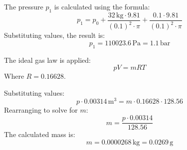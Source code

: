 The pressure \( p_1 \) is calculated using the formula:  
\[
p_1 = p_0 + \frac{32 \, \text{kg} \cdot 9.81}{(0.1)^2 \cdot \pi} + \frac{0.1 \cdot 9.81}{(0.1)^2 \cdot \pi}
\]  
Substituting values, the result is:  
\[
p_1 = 110023.6 \, \text{Pa} = 1.1 \, \text{bar}
\]  

The ideal gas law is applied:  
\[
pV = mRT
\]  
Where \( R = 0.16628 \).  

Substituting values:  
\[
p \cdot 0.00314 \, \text{m}^3 = m \cdot 0.16628 \cdot 128.56
\]  
Rearranging to solve for \( m \):  
\[
m = \frac{p \cdot 0.00314}{128.56}
\]  
The calculated mass is:  
\[
m = 0.0000268 \, \text{kg} = 0.0269 \, \text{g}
\]
